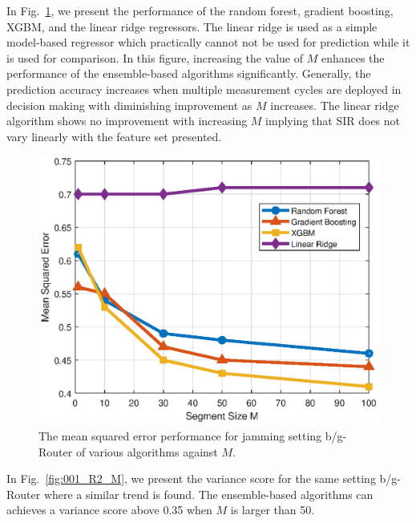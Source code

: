 In Fig.~\ref{fig:001_MSE_M}, we present the performance of the random forest, gradient boosting, XGBM, and the linear ridge regressors. The linear ridge is used as a simple model-based regressor which practically cannot not be used for prediction while it is used for comparison. In this figure, increasing the value of $M$ enhances the performance of the ensemble-based algorithms significantly. Generally, the prediction accuracy increases when multiple measurement cycles are deployed in decision making with diminishing improvement as $M$ increases.  The linear ridge algorithm shows no improvement with increasing $M$ implying that SIR does not vary linearly with the feature set presented.

	\begin{figure}[tbp]
	    \centering
		\includegraphics[width=0.9\columnwidth]{./chapter-ftml/plots/001_MSE_M.eps}
		\caption{The mean squared error performance for jamming setting b/g-Router of various algorithms against $M$.}
		\label{fig:001_MSE_M}      
	\end{figure}

In Fig.~\ref{fig:001_R2_M}, we present the variance score for the same setting b/g-Router where a similar trend is found. The ensemble-based algorithms can achieves a variance score above 0.35 when $M$ is larger than 50. 

